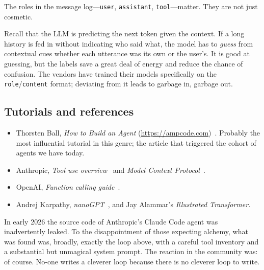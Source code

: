 The roles in the message log---\texttt{user},
\texttt{assistant}, \texttt{tool}---matter.  They are not just
cosmetic.

\begin{intuition}
  Recall that the LLM is predicting the next token given the
  context.  If a long history is fed in without indicating who
  said what, the model has to \emph{guess} from contextual cues
  whether each utterance was its own or the user's.  It is good
  at guessing, but the labels save a great deal of energy and
  reduce the chance of confusion.  The vendors have trained
  their models specifically on the \texttt{role}/\texttt{content}
  format; deviating from it leads to garbage in, garbage out.
\end{intuition}

\subsection{Tutorials and references}

\begin{greybox}
  \begin{itemize}
    \item Thorsten Ball, \emph{How to Build an Agent}
      (\url{https://ampcode.com})~\cite{ball2025agent}.  Probably
      the most influential tutorial in this genre; the article
      that triggered the cohort of agents we have today.
    \item Anthropic, \emph{Tool use overview}~\cite{anthropictools}
      and \emph{Model Context Protocol}~\cite{mcp2024}.
    \item OpenAI, \emph{Function calling guide}~\cite{openaitools}.
    \item Andrej Karpathy, \emph{nanoGPT}~\cite{karpathynano},
      and Jay Alammar's \emph{Illustrated Transformer}.
  \end{itemize}
\end{greybox}

\begin{historical}
  In early 2026 the source code of Anthropic's Claude Code agent
  was inadvertently leaked.  To the disappointment of those
  expecting alchemy, what was found was, broadly, exactly the
  loop above, with a careful tool inventory and a substantial
  but unmagical system prompt.  The reaction in the community
  was: of course.  No-one writes a cleverer loop because there
  is no cleverer loop to write.
\end{historical}

